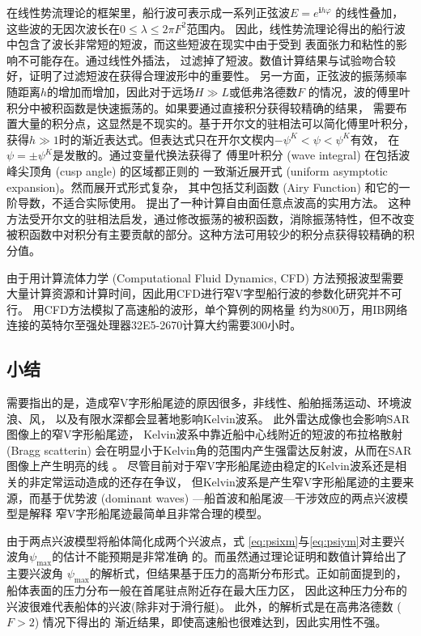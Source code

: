 在线性势流理论的框架里，船行波可表示成一系列正弦波$E=e^{\mathbf{i}h\varphi}$
的线性叠加，这些波的无因次波长在$0\le\lambda\le2\pi F^2$范围内。
因此，线性势流理论得出的船行波中包含了波长非常短的短波，而这些短波在现实中由于受到
表面张力和粘性的影响不可能存在。通过线性外插法，\parencite{Noblesse2013Evaluation}
过滤掉了短波。数值计算结果与试验吻合较好，证明了过滤短波在获得合理波形中的重要性。
另一方面，正弦波的振荡频率随距离$h$的增加而增加，因此对于远场$H\gg L$或低弗洛德数$F$
的情况，波的傅里叶积分中被积函数是快速振荡的。如果要通过直接积分获得较精确的结果，
需要布置大量的积分点，这显然是不现实的。基于开尔文的驻相法可以简化傅里叶积分，
获得$h\gg 1$时的渐近表达式。但表达式只在开尔文楔内$-\psi^K<\psi<\psi^K$有效，
在$\psi=\pm\psi^K$是发散的。\parencite{Chester1957extension}通过变量代换法获得了
傅里叶积分 (wave integral) 在包括波峰尖顶角 (cusp angle) 的区域都正则的
一致渐近展开式 (uniform asymptotic expansion)。然而展开式形式复杂，
其中包括艾利函数 (Airy Function) 和它的一阶导数，不适合实际使用。
\parencite{Zhang2015Stationary}提出了一种计算自由面任意点波高的实用方法。
这种方法受开尔文的驻相法启发，通过修改振荡的被积函数，消除振荡特性，但不改变
被积函数中对积分有主要贡献的部分。这种方法可用较少的积分点获得较精确的积分值。

由于用计算流体力学 (Computational Fluid Dynamics, CFD) 方法预报波型需要
大量计算资源和计算时间，因此用CFD进行窄V字型船行波的参数化研究并不可行。
\parencite{Wang2015Numerical}用CFD方法模拟了高速船的波形，单个算例的网格量
约为800万，用IB网络连接的英特尔至强处理器32E5-2670计算大约需要300小时。


\subsection{小结}

需要指出的是，造成窄V字形船尾迹的原因很多，非线性、船舶摇荡运动、环境波浪、风，
以及有限水深\supercite{Brown1989Observations,Mei1991Note,Zhu2008Resonant,
Shugan2006Kelvin,Fang2011Kelvin}都会显著地影响Kelvin波系。
此外雷达成像也会影响SAR图像上的窄V字形船尾迹，
Kelvin波系中靠近船中心线附近的短波的布拉格散射 (Bragg scatterin) 
会在明显小于Kelvin角的范围内产生强雷达反射波，从而在SAR图像上产生明亮的线
\supercite{Reed2002Ship,Milgram1988theory}。
尽管目前对于窄V字形船尾迹由稳定的Kelvin波系还是相关的非定常运动造成的还存在争议，
但Kelvin波系是产生窄V字形船尾迹的主要来源，而基于优势波 (dominant waves) 
---船首波和船尾波---干涉效应的两点兴波模型\supercite{Noblesse2014Why}是解释
窄V字形船尾迹最简单且非常合理的模型。

由于两点兴波模型\supercite{Noblesse2014Why}将船体简化成两个兴波点，式
\eqref{eq:psixm}与\eqref{eq:psiym}对主要兴波角$\psi_{\max}$的估计不能预期是非常准确
的。而\parencite{Darmon2014Kelvin}虽然通过理论证明和数值计算给出了主要兴波角
$\psi_{\max}$的解析式，但结果基于压力的高斯分布形式。正如前面提到的，
船体表面的压力分布一般在首尾驻点附近存在最大压力区，
因此这种压力分布的兴波很难代表船体的兴波(除非对于滑行艇)。
此外，\parencite{Darmon2014Kelvin}的解析式是在高弗洛德数 ($F>2$) 情况下得出的
渐近结果，即使高速船也很难达到，因此实用性不强。

